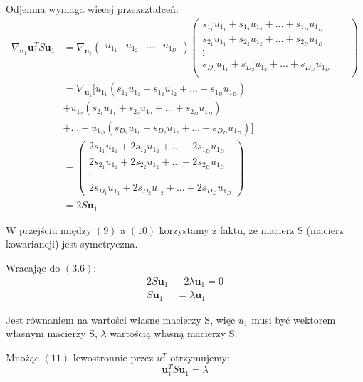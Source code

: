 \documentclass[oneside, eng]{mgr}
\newcommand{\bb}{\textbf}
\begin{document}
Odjemna wymaga wiecej przekształceń:
\begin{align}
	\nabla_{\bb{u}_1} \bb{u}_1^T S \bb{u}_1 
	&= \nabla_{\bb{u}_1} 
	\left( \begin{array}{llll} u_{1_1} & u_{1_2} & ... & u_{1_D} \end{array} \right)
	\begin{pmatrix}
         s_{1_1} u_{1_1} + s_{1_2} u_{1_2} + ... + s_{1_D} u_{1_D}  \\
		 s_{2_1} u_{1_1} + s_{2_2} u_{1_2} + ... + s_{2_D} u_{1_D} && \\
		 \vdots     \\
		 s_{D_1} u_{1_1} + s_{D_2} u_{1_2} + ... + s_{D_D} u_{1_D} && \\
    \end{pmatrix} \\
    &= \nabla_{\bb{u}_1} [u_{1_1} (s_{1_1} u_{1_1} + s_{1_2} u_{1_2} + ... + s_{1_D} u_{1_D})  \\
    				&+ u_{1_2} (s_{2_1} u_{1_1} + s_{2_2} u_{1_2} + ... + s_{2_D} u_{1_D}) \nonumber \\
    				&+ ... + u_{1_D} (s_{D_1} u_{1_1} + s_{D_2} u_{1_2} + ... + s_{D_D} u_{1_D})] \nonumber \\
    &= \begin{pmatrix}
    	2 s_{1_1} u_{1_1} + 2 s_{1_2} u_{1_2} + ... + 2 s_{1_D} u_{1_D}  \\
    	2 s_{2_1} u_{1_1} + 2 s_{2_2} u_{1_2} + ... + 2 s_{2_D} u_{1_D}  \\
    	\vdots     \\
	    2 s_{D_1} u_{1_1} + 2 s_{D_2} u_{1_2} + ... + 2 s_{D_D} u_{1_D}
    \end{pmatrix} \\
    &= 2 S \bb{u}_1
\end{align}

W przejściu między $(9)$ a $(10)$ korzystamy z faktu, że macierz S (macierz kowariancji) jest symetryczna.

Wracając do $(3.6)$:
\begin{align}
	2 S \bb{u}_1 &- 2 \lambda \bb{u}_1 = 0	\nonumber \\
	S \bb{u}_1 &= \lambda \bb{u}_1 
\end{align}

Jest równaniem na wartości własne macierzy S, więc $u_1$ musi być wektorem własnym macierzy S, $\lambda$ wartością własną macierzy S.

Mnożąc $(11)$ lewostronnie przez $u_1^T$ otrzymujemy:
\begin{equation}
	\bb{u}_1^T S \bb{u}_1 = \lambda
\end{equation}
\end{document}
